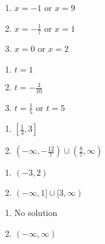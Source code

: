 \documentclass{ximera}
\begin{document}
\begin{multicols}{3} 
\begin{enumerate}
\setcounter{enumi}{\value{HW}}

\item $x = -1$ or $x = 9$

\item $x = -\frac{1}{7}$ or $x = 1$

\item $x = 0$ or $x = 2$

\setcounter{HW}{\value{enumi}}
\end{enumerate}
\end{multicols}

\begin{multicols}{3} 
\begin{enumerate}
\setcounter{enumi}{\value{HW}}

\item $t=1$

\item $t = -\frac{3}{10}$

\item $t = \frac{1}{5}$ or $t = 5$

\setcounter{HW}{\value{enumi}}
\end{enumerate}
\end{multicols}

\begin{multicols}{2}
\begin{enumerate}
\setcounter{enumi}{\value{HW}}

\item $\left[\frac{1}{3}, 3\right]$
\item $\left(-\infty, -\frac{12}{7} \right) \cup \left(\frac{8}{7}, \infty\right)$

\setcounter{HW}{\value{enumi}}
\end{enumerate}
\end{multicols}

\begin{multicols}{2}
\begin{enumerate}
\setcounter{enumi}{\value{HW}}

\item $(-3,2)$   
\item $(-\infty,1] \cup [3,\infty)$

\setcounter{HW}{\value{enumi}}
\end{enumerate}
\end{multicols}

\begin{multicols}{2}
\begin{enumerate}
\setcounter{enumi}{\value{HW}}

\item No solution  
\item $(-\infty, \infty)$

\setcounter{HW}{\value{enumi}}
\end{enumerate}
\end{multicols}
\end{document}
